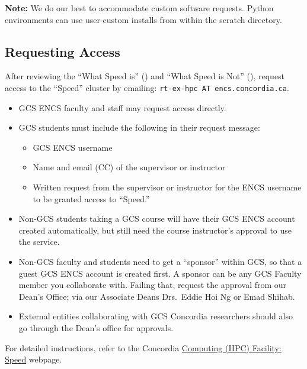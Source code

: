 \documentclass{easychair}
\begin{document}
\noindent \textbf{Note:} We do our best to accommodate custom software requests. Python environments can use user-custom installs 
from within the scratch directory.\\

\subsection{Requesting Access}
\label{sect:access-requests}

After reviewing the ``What Speed is'' () and
``What Speed is Not'' (), request access to the ``Speed'' 
cluster by emailing: \texttt{rt-ex-hpc AT encs.concordia.ca}.

\begin{itemize} 
	\item GCS ENCS faculty and staff may request access directly.
	\item GCS students must include the following in their request message:
	\begin{itemize}
		\item GCS ENCS username
		\item Name and email (CC) of the supervisor or instructor
		\item Written request from the supervisor or instructor for the ENCS username to be granted access to ``Speed.''
	\end{itemize}
	\item Non-GCS students taking a GCS course will have their GCS ENCS account created automatically, but still need the course instructor’s approval to use the service.
	\item Non-GCS faculty and students need to get a ``sponsor'' within GCS, so that a guest GCS ENCS account is created first. A sponsor can be any GCS Faculty member
	you collaborate with. Failing that, request the approval from our Dean's Office;
	via our Associate Deans Drs.\ Eddie Hoi Ng or Emad Shihab.
	\item External entities collaborating with GCS Concordia researchers should also go through the Dean’s office for approvals.
\end{itemize}

For detailed instructions, refer to the Concordia 
\href{https://www.concordia.ca/ginacody/aits/speed.html}{Computing (HPC) Facility: Speed} webpage.
\end{document}
